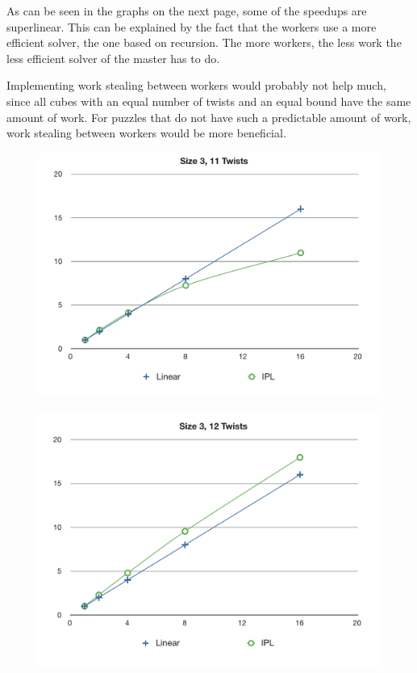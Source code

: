 \documentclass[11pt,a4paper]{article}
\begin{document}
As can be seen in the graphs on the next page, some of the speedups are superlinear. This can be explained by the fact that the workers use a more efficient solver, the one based on recursion. The more workers, the less work the less efficient solver of the master has to do.

Implementing work stealing between workers would probably not help much, since all cubes with an equal number of twists and an equal bound have the same amount of work. For puzzles that do not have such a predictable amount of work, work stealing between workers would be more beneficial.

\begin{figure}[h]
\includegraphics[scale=0.5]{figures/3-11.pdf}
\end{figure}

\begin{figure}[h]
\includegraphics[scale=0.5]{figures/3-12.pdf}
\end{figure}
\end{document}
